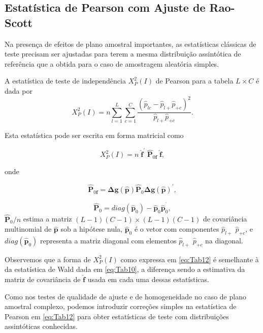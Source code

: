 \documentclass[]{book}
\theoremstyle{definition}
\theoremstyle{definition}
\theoremstyle{definition}
\theoremstyle{remark}
\begin{document}
\subsection{Estatística de Pearson com Ajuste de
Rao-Scott}\label{estatistica-de-pearson-com-ajuste-de-rao-scott}

Na presença de efeitos de plano amostral importantes, as estatísticas
clássicas de teste precisam ser ajustadas para terem a mesma
distribuição assintótica de referência que a obtida para o caso de
amostragem aleatória simples.

A estatística de teste de independência \(X_{P}^{2}\left( I\right)\) de
Pearson para a tabela \(L\times C\) é dada por \[
X_{P}^{2}\left( I\right) =n\sum\limits_{l=1}^{L}\sum\limits_{c=1}^{C}\frac{
\left( \hat{p}_{lc}-\hat{p}_{l+}\hat{p}_{+c}\right) ^{2}}{\hat{p}_{l+}\hat{p}
_{+c}}.
\]

Esta estatística pode ser escrita em forma matricial como

\begin{equation}
X_{P}^{2}\left( I\right) =n\;\mathbf{\hat{f}}^{\prime }\;\widehat{\mathbf{P}}
_{0\mathbf{f}}\;\mathbf{\hat{f}},  \label{eq:Tab12}
\end{equation}

onde

\begin{equation}
\widehat{\mathbf{P}}_{0\mathbf{f}}=\mathbf{\Delta g}\left( \mathbf{\hat{p}}
\right) \mathbf{\hat{P}}_{0}\mathbf{\Delta g}\left( \mathbf{\hat{p}}\right)
^{\prime },  \label{eq:Tab13}
\end{equation}

\[
\mathbf{\hat{P}}_{0}=diag\left( \mathbf{\hat{p}}_{0}\right) -\mathbf{\hat{p}}
_{0}\mathbf{\hat{p}}_{0}^{^{\prime }}, 
\] \(\widehat{\mathbf{P}}_{0}/n\) estima a matriz
\(\left( L-1\right) \left( C-1\right) \times \left( L-1\right) \left( C-1\right)\)
de covariância multinomial de \(\mathbf{\hat{p}}\) sob a hipótese nula,
\(\mathbf{\hat{p}}_{0}\) é o vetor com componentes \(\hat{p}_{l+}\)
\(\hat{p}_{+c}\), e \(diag\left( \mathbf{\hat{p}}_{0}\right)\)
representa a matriz diagonal com elementos \(\hat{p}_{l+}\)
\(\hat{p}_{+c}\) na diagonal.

Observemos que a forma de \(X_{P}^{2}\left( I\right)\) como expressa em
\eqref{eq:Tab12} é semelhante à da estatística de Wald dada em
\eqref{eq:Tab10}, a diferença sendo a estimativa da matriz de covariância
de \(\mathbf{\hat{f}}\) usada em cada uma dessas estatísticas.

Como nos testes de qualidade de ajuste e de homogeneidade no caso de
plano amostral complexo, podemos introduzir correções simples na
estatística de Pearson em \eqref{eq:Tab12} para obter estatísticas de
teste com distribuições assintóticas conhecidas.
\end{document}

